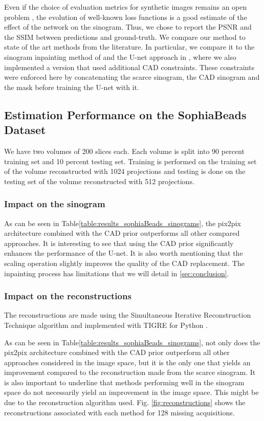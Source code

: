 \documentclass[../main.tex]{subfiles}
\begin{document}
\label{sec:results}
Even if the choice of evaluation metrics for synthetic images remains an open problem \cite{salimans2016improved}, the evolution of well-known loss functions is a good estimate of the effect of the network on the sinogram. Thus, we chose to report the PSNR and the SSIM between predictions and ground-truth. We compare our method to state of the art methods from the literature. In particular, we compare it to the sinogram inpainting method of \cite{yoo2019sinogram} and the U-net approach in \cite{lee2018deep}, where we also implemented a version that used additional CAD constraints. These constraints were enforced here by concatenating the scarce sinogram, the CAD sinogram and the mask before training the U-net with it.

\subsection{Estimation Performance on the SophiaBeads Dataset}
We have two volumes of 200 slices each. Each volume is split into 90 percent training set and 10 percent testing set. Training is performed on the training set of the volume reconstructed with 1024 projections and testing is done on the testing set of the volume reconstructed with 512 projections.

\subsubsection{Impact on the sinogram}
\label{impact_on_the_sinogram_sophiabeads}

As can be seen in Table\ref{table:results_sophiaBeads_sinograms}, the pix2pix architecture combined with the CAD prior outperforms all other compared approaches. It is interesting to see that using the CAD prior significantly enhances the performance of the U-net. It is also worth mentioning that the scaling operation slightly improves the quality of the CAD replacement. The inpainting process has limitations that we  will detail in \ref{sec:conclusion}.

\subsubsection{Impact on the reconstructions}
The reconstructions are made using the Simultaneous Iterative Reconstruction Technique algorithm and implemented with TIGRE for Python \cite{biguri2016tigre}.

As can be seen in Table\ref{table:results_sophiaBeads_sinograms}, not only does the pix2pix architecture combined with the CAD prior outperform all other approaches considered in the image space, but it is the only one that yields an improvement compared to the reconstruction made from the scarce sinogram. It is also important to underline that methods performing well in the sinogram space do not necessarily yield an improvement in the image space. This might be due to the reconstruction algorithm used. Fig. \ref{fig:reconstructions} shows the reconstructions associated with each method for 128 missing acquisitions.
\end{document}
